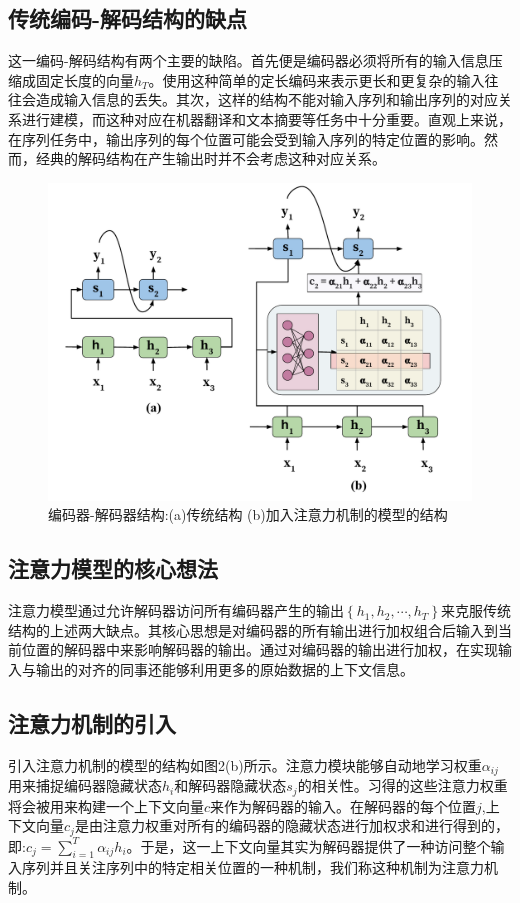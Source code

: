 \documentclass{ctexart}
\begin{document}
\subsection{传统编码-解码结构的缺点}
这一编码-解码结构有两个主要的缺陷。首先便是编码器必须将所有的输入信息压缩成固定长度的向量$h_T$。使用这种简单的定长编码来表示更长和更复杂的输入往往会造成输入信息的丢失。其次，这样的结构不能对输入序列和输出序列的对应关系进行建模，而这种对应在机器翻译和文本摘要等任务中十分重要。直观上来说，在序列任务中，输出序列的每个位置可能会受到输入序列的特定位置的影响。然而，经典的解码结构在产生输出时并不会考虑这种对应关系。
\begin{figure}[htb!]
	\centering
	\includegraphics[scale=0.6]{sec2f.pdf}
	\caption{编码器-解码器结构:(a)传统结构 (b)加入注意力机制的模型的结构}
\end{figure}
\subsection{注意力模型的核心想法}
注意力模型通过允许解码器访问所有编码器产生的输出$\left\{h_1,h_2,\cdots,h_T\right\}$来克服传统结构的上述两大缺点。其核心思想是对编码器的所有输出进行加权组合后输入到当前位置的解码器中来影响解码器的输出。通过对编码器的输出进行加权，在实现输入与输出的对齐的同事还能够利用更多的原始数据的上下文信息。
\subsection{注意力机制的引入}
引入注意力机制的模型的结构如图2(b)所示。注意力模块能够自动地学习权重$\alpha_{ij}$用来捕捉编码器隐藏状态$h_i$和解码器隐藏状态$s_j$的相关性。习得的这些注意力权重将会被用来构建一个上下文向量$c$来作为解码器的输入。在解码器的每个位置$j$,上下文向量$c_j$是由注意力权重对所有的编码器的隐藏状态进行加权求和进行得到的，即:$c_j=\sum_{i=1}^{T}\alpha_{ij}h_i$。于是，这一上下文向量其实为解码器提供了一种访问整个输入序列并且关注序列中的特定相关位置的一种机制，我们称这种机制为注意力机制。
\end{document}
